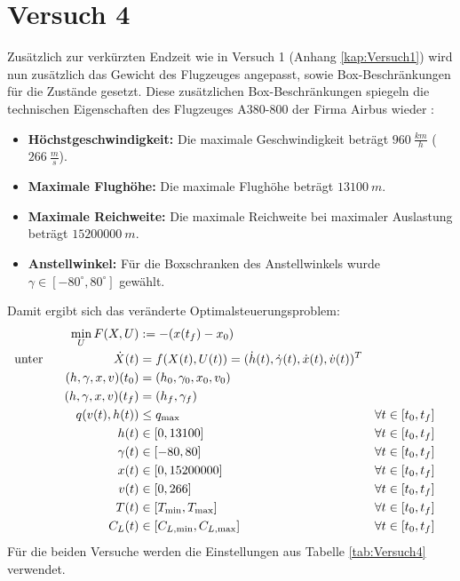 \section{Versuch 4}\label{kap:Versuch4}
Zusätzlich zur verkürzten Endzeit wie in Versuch 1 (Anhang \ref{kap:Versuch1}) wird nun zusätzlich das Gewicht des Flugzeuges angepasst, sowie Box-Beschränkungen für die Zustände gesetzt. Diese zusätzlichen Box-Beschränkungen spiegeln die technischen Eigenschaften des Flugzeuges A380-800 der Firma Airbus wieder \cite{A380Tech}:
\begin{itemize}
\item \textbf{Höchstgeschwindigkeit:} Die maximale Geschwindigkeit beträgt $960 \ \frac{km}{h}$ ($266 \ \frac{m}{s}$).
%
\item \textbf{Maximale Flughöhe:} Die maximale Flughöhe beträgt $13100 \ m$.
%
\item \textbf{Maximale Reichweite:} Die maximale Reichweite bei maximaler Auslastung beträgt $15200000 \ m$.
%
\item \textbf{Anstellwinkel:} Für die Boxschranken des Anstellwinkels wurde $\gamma \in [-80^{\circ} , 80^{\circ}]$ gewählt. 
\end{itemize}
Damit ergibt sich das veränderte Optimalsteuerungsproblem:
\begin{align*}
\min_{U} F(X,U) &:= -(x(t_f) - x_0) \\
\text{unter} \hspace{20mm} \dot{X}(t) &= f(X(t),U(t)) = (\dot{h}(t),\dot{\gamma}(t),\dot{x}(t),\dot{v}(t))^T \\
(h,\gamma,x,v)(t_0) &= (h_0,\gamma_0,x_0,v_0) \\
(h,\gamma,x,v)(t_f) &= (h_f,\gamma_f) \hspace{36mm} \\
q(v(t),h(t)) &\leq q_{\max} & & \forall t \in [t_0,t_f] \\
h(t) &\in [0,13100] & & \forall t \in [t_0,t_f] \\
\gamma(t) &\in [-80,80] & & \forall t \in [t_0,t_f] \\
x(t) &\in [0,15200000] & & \forall t \in [t_0,t_f] \\
v(t) &\in [0,266] & & \forall t \in [t_0,t_f] \\
T(t) &\in [T_{\min},T_{\max}] & & \forall t \in [t_0,t_f] \\
C_L(t) &\in [C_{L, \min},C_{L, \max}] & & \forall t \in [t_0,t_f]
\end{align*}
Für die beiden Versuche werden die Einstellungen aus Tabelle \ref{tab:Versuch4} verwendet.
